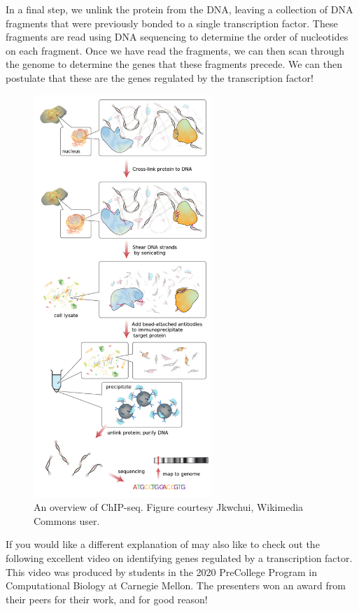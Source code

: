 In a final step, we unlink the protein from the DNA, leaving a collection of DNA fragments that were previously bonded to a single transcription factor. These fragments are read using DNA sequencing to determine the order of nucleotides on each fragment. Once we have read the fragments, we can then scan through the genome to determine the genes that these fragments precede. We can then postulate that these are the genes regulated by the transcription factor!

\begin{figure}[h]
\centering
\mySfFamily
\includegraphics[width = 0.6\textwidth]{../assets/images/600px/ChIP-seq_workflow.png}
\caption{An overview of ChIP-seq. Figure courtesy Jkwchui, Wikimedia Commons user.}
\label{fig:ChIP-seq_workflow}
\end{figure}

If you would like a different explanation of  may also like to check out the following excellent video on identifying genes regulated by a transcription factor. This video was produced by students in the 2020 PreCollege Program in Computational Biology at Carnegie Mellon. The presenters won an award from their peers for their work, and for good reason!


